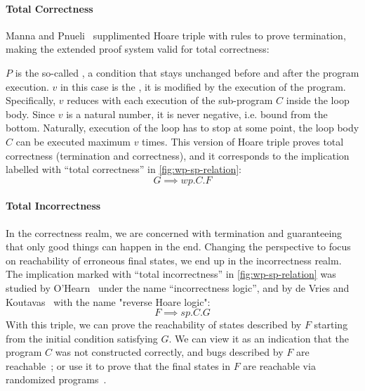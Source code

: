\paragraph{Total Correctness}
Manna and Pnueli~\cite{manna74} supplimented Hoare triple with rules to prove termination, making the extended proof system valid for total correctness: 
\begin{center}
	\begin{prooftree}
	\end{prooftree}
\end{center}
$P$ is the so-called , a condition that stays unchanged before and after the program execution. 
$v$ in this case is the , it is modified by the execution of the program. 
Specifically, $v$ reduces with each execution of the sub-program $C$ inside the loop body. 
Since $v$ is a natural number, it is never negative, i.e. bound from the bottom. 
Naturally, execution of the loop has to stop at some point, the loop body $C$ can be executed maximum $v$ times. 
This version of Hoare triple proves total correctness (termination and correctness), and it corresponds to the implication labelled with ``total correctness'' in \autoref{fig:wp-sp-relation}: 
$$G\implies wp.C.F$$

\paragraph{Total Incorrectness}
In the correctness realm, we are concerned with termination and guaranteeing that only good things can happen in the end. 
Changing the perspective to focus on reachability of erroneous final states, we end up in the incorrectness realm. 
The implication marked with ``total incorrectness'' in \autoref{fig:wp-sp-relation} was studied by O'Hearn~\cite{ohearn2020IncorrectnessLogic} under the name ``incorrectness logic'', and by de Vries and Koutavas~\cite{vries11} with the name "reverse Hoare logic": 
$$F\implies sp.C.G$$
With this triple, we can prove the reachability of states described by $F$ starting from the initial condition satisfying $G$. 
We can view it as an indication that the program $C$ was not constructed correctly, and bugs described by $F$ are reachable~\cite{ohearn2020IncorrectnessLogic}; or use it to prove that the final states in $F$ are reachable via randomized programs~\cite{vries11}. 

